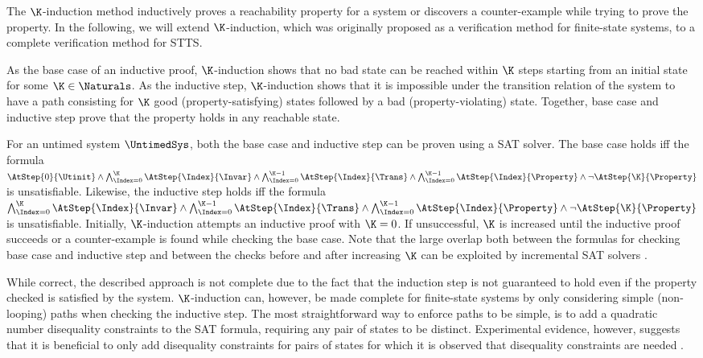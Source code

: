 The $\K$-induction method \cite{SheeranEtAl:FMCAD2000,EenSorensson:2003}
inductively proves a reachability property for a system or
discovers a counter-example while trying to prove the property.
In the following, we will extend $\K$-induction,
which was originally proposed as a verification method for finite-state systems,
to a complete verification method for STTS.

As the base case of an inductive proof, $\K$-induction shows that no bad
state can be reached within $\K$ steps starting from an initial state
for some $\K \in \Naturals$. As the inductive step, $\K$-induction shows that it is impossible under the transition relation of the system to have a path consisting for $\K$ good (property-satisfying) states followed by a bad (property-violating) state. Together, base case and inductive step prove that the property holds in any reachable state.

For an untimed system $\UntimedSys$,
both the base case and inductive step can be proven using a SAT solver.
The base case holds iff the formula
$\AtStep{0}{\Utinit}
\land
\bigwedge_{\Index = 0}^{\K} \AtStep{\Index}{\Invar}
\land
\bigwedge_{\Index = 0}^{\K-1}\AtStep{\Index}{\Trans}
\land
\bigwedge_{\Index = 0}^{\K-1}\AtStep{\Index}{\Property}
\land
\neg\AtStep{\K}{\Property}$
is unsatisfiable. Likewise, the inductive step holds iff the formula
$\bigwedge_{\Index = 0}^{\K} \AtStep{\Index}{\Invar}
\wedge \bigwedge_{\Index = 0}^{\K-1}\AtStep{\Index}{\Trans}
\wedge \bigwedge_{\Index = 0}^{\K-1}\AtStep{\Index}{\Property}
\wedge \neg\AtStep{\K}{\Property}$
is unsatisfiable.
Initially, $\K$-induction attempts an inductive proof with $\K=0$. If unsuccessful, $\K$ is increased until the inductive proof succeeds or a counter-example is found while checking the base case.
Note that the large overlap both between the formulas for checking base case and inductive step and between the checks before and after increasing $\K$ can be exploited by incremental SAT solvers \cite{EenSorensson:2003}.


While correct, the described approach is not complete due to the fact that the induction step is not guaranteed to hold even if the property checked is satisfied by the system. $\K$-induction can, however, be made complete for finite-state systems by only considering simple (non-looping) paths when checking the inductive step.
The most straightforward way to enforce paths to be simple, is to add a quadratic number disequality constraints to the SAT formula, requiring any pair of states to be distinct. Experimental evidence, however, suggests that it is beneficial to only add disequality constraints for pairs of states for which it is observed that disequality constraints are needed \cite{EenSorensson:2003}. 

